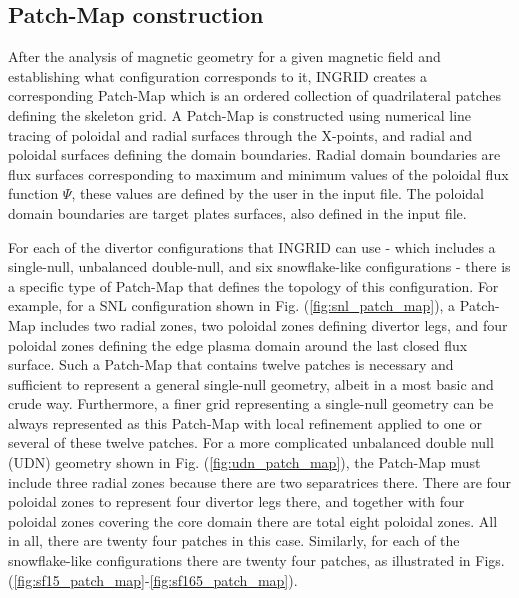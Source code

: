 \subsection{Patch-Map construction}

After the analysis of magnetic geometry for a given magnetic field
and establishing what configuration corresponds to it, INGRID creates
a corresponding Patch-Map which is an ordered collection of
quadrilateral patches defining the skeleton grid. A Patch-Map is
constructed using numerical line tracing of poloidal and radial
surfaces through the X-points, and radial and poloidal surfaces
defining the domain boundaries. Radial domain boundaries are flux
surfaces corresponding to maximum and minimum values of the poloidal
flux function $\Psi$, these values are defined by the user in the
input file. The poloidal domain boundaries are target plates surfaces,
also defined in the input file.

For each of the divertor configurations that INGRID can use - which
includes a single-null, unbalanced double-null, and six snowflake-like
configurations - there is a specific type of Patch-Map that defines
the topology of this configuration. For example, for a SNL
configuration shown in Fig. (\ref{fig:snl_patch_map}), a Patch-Map includes two radial zones,
two poloidal zones defining divertor legs, and four poloidal zones
defining the edge plasma domain around the last closed flux
surface. Such a Patch-Map that contains twelve patches is necessary
and sufficient to represent a general single-null geometry, albeit in
a most basic and crude way. Furthermore, a finer grid representing a
single-null geometry can be always represented as this Patch-Map with
local refinement applied to one or several of these twelve patches.
For a more complicated unbalanced double null (UDN) geometry shown in
Fig. (\ref{fig:udn_patch_map}), the Patch-Map must include three radial zones because there
are two separatrices there. There are four poloidal zones to represent
four divertor legs there, and together with four poloidal zones
covering the core domain there are total eight poloidal zones. All in
all, there are twenty four patches in this case. Similarly, for each
of the snowflake-like configurations there are twenty four patches, as
illustrated in Figs. (\ref{fig:sf15_patch_map}-\ref{fig:sf165_patch_map}).
